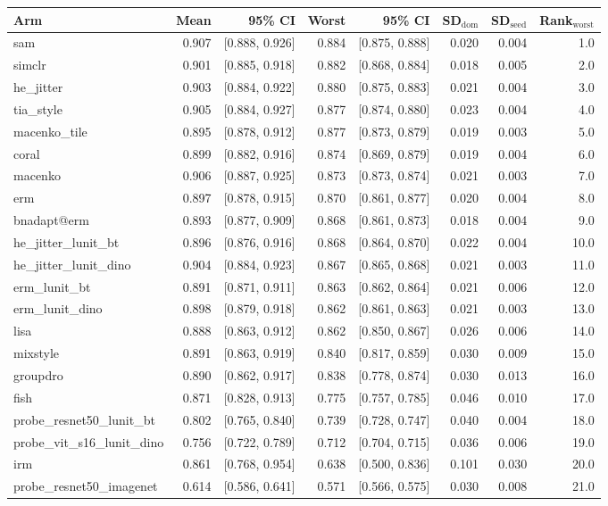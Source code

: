 \begin{tabular}{lrrrrrrr}
\toprule
Arm & Mean & 95\% CI & Worst & 95\% CI & SD$_\text{dom}$ & SD$_\text{seed}$ & Rank$_\text{worst}$ \\
\midrule
sam & 0.907 & [0.888, 0.926] & 0.884 & [0.875, 0.888] & 0.020 & 0.004 & 1.0 \\
simclr & 0.901 & [0.885, 0.918] & 0.882 & [0.868, 0.884] & 0.018 & 0.005 & 2.0 \\
he\_jitter & 0.903 & [0.884, 0.922] & 0.880 & [0.875, 0.883] & 0.021 & 0.004 & 3.0 \\
tia\_style & 0.905 & [0.884, 0.927] & 0.877 & [0.874, 0.880] & 0.023 & 0.004 & 4.0 \\
macenko\_tile & 0.895 & [0.878, 0.912] & 0.877 & [0.873, 0.879] & 0.019 & 0.003 & 5.0 \\
coral & 0.899 & [0.882, 0.916] & 0.874 & [0.869, 0.879] & 0.019 & 0.004 & 6.0 \\
macenko & 0.906 & [0.887, 0.925] & 0.873 & [0.873, 0.874] & 0.021 & 0.003 & 7.0 \\
erm & 0.897 & [0.878, 0.915] & 0.870 & [0.861, 0.877] & 0.020 & 0.004 & 8.0 \\
bnadapt@erm & 0.893 & [0.877, 0.909] & 0.868 & [0.861, 0.873] & 0.018 & 0.004 & 9.0 \\
he\_jitter\_lunit\_bt & 0.896 & [0.876, 0.916] & 0.868 & [0.864, 0.870] & 0.022 & 0.004 & 10.0 \\
he\_jitter\_lunit\_dino & 0.904 & [0.884, 0.923] & 0.867 & [0.865, 0.868] & 0.021 & 0.003 & 11.0 \\
erm\_lunit\_bt & 0.891 & [0.871, 0.911] & 0.863 & [0.862, 0.864] & 0.021 & 0.006 & 12.0 \\
erm\_lunit\_dino & 0.898 & [0.879, 0.918] & 0.862 & [0.861, 0.863] & 0.021 & 0.003 & 13.0 \\
lisa & 0.888 & [0.863, 0.912] & 0.862 & [0.850, 0.867] & 0.026 & 0.006 & 14.0 \\
mixstyle & 0.891 & [0.863, 0.919] & 0.840 & [0.817, 0.859] & 0.030 & 0.009 & 15.0 \\
groupdro & 0.890 & [0.862, 0.917] & 0.838 & [0.778, 0.874] & 0.030 & 0.013 & 16.0 \\
fish & 0.871 & [0.828, 0.913] & 0.775 & [0.757, 0.785] & 0.046 & 0.010 & 17.0 \\
probe\_resnet50\_lunit\_bt & 0.802 & [0.765, 0.840] & 0.739 & [0.728, 0.747] & 0.040 & 0.004 & 18.0 \\
probe\_vit\_s16\_lunit\_dino & 0.756 & [0.722, 0.789] & 0.712 & [0.704, 0.715] & 0.036 & 0.006 & 19.0 \\
irm & 0.861 & [0.768, 0.954] & 0.638 & [0.500, 0.836] & 0.101 & 0.030 & 20.0 \\
probe\_resnet50\_imagenet & 0.614 & [0.586, 0.641] & 0.571 & [0.566, 0.575] & 0.030 & 0.008 & 21.0 \\
\bottomrule
\end{tabular}
